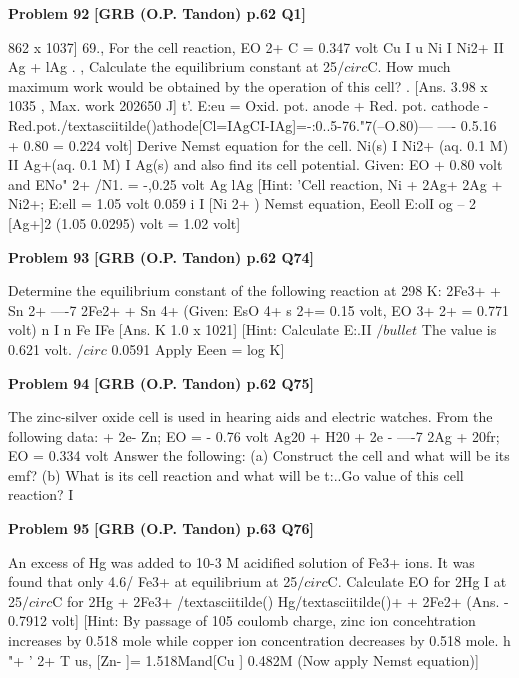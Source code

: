 \begin{problembox}
\textbf{Problem 92} \hfill \textbf{[GRB (O.P. Tandon) p.62 Q1]}
\label{q:ext-grb_all_questions-92}

862 x 1037] 
69., For the cell reaction, 
EO 2+ C = 0.347 volt 
Cu 
I u 
Ni I Ni2+ II Ag + lAg 
. 
, 
Calculate the equilibrium constant at 25$/circ$C. How much 
maximum work would be obtained by the operation of this 
cell? 
. 
[Ans. 
3.98 x 1035 , Max. work 
202650 J] 
t'. 
E:eu = Oxid. pot. anode + Red. pot. cathode 
-Red.pot./textasciitilde()athode[Cl=IAgCI-IAg]=-:0..5-76."7(--O.80)--- ----
0.5.16 + 0.80 = 0.224 volt] 
Derive Nemst equation for the cell. 
Ni(s) I Ni2+ (aq. 0.1 M) II Ag+(aq. 0.1 M) I Ag(s) 
and also find its cell potential. Given: 
EO + 
0.80 volt and ENo" 2+ /N1. = -,0.25 volt 
Ag lAg 
[Hint: 'Cell reaction, 
Ni + 2Ag+ 
2Ag + Ni2+; 
E:ell = 1.05 volt 
0.059 i I 
[Ni 2+ ) 
Nemst equation, Eeoll 
E:olI 
og --
2 
[Ag+]2 
(1.05 
0.0295) volt 
= 1.02 volt]
\end{problembox}

\begin{problembox}
\textbf{Problem 93} \hfill \textbf{[GRB (O.P. Tandon) p.62 Q74]}
\label{q:ext-grb_all_questions-93}

Determine the equilibrium constant of the following reaction 
at 298 K: 
2Fe3+ + Sn 2+ ----7 2Fe2+ + Sn 4+ 
(Given: EsO 4+ s 2+= 0.15 volt, EO 3+ 
2+ = 0.771 volt) 
n 
I n 
Fe 
IFe 
[Ans. 
K 
1.0 x 1021] 
[Hint: 
Calculate E:.II $/bullet$ The value is 0.621 volt. 
$/circ$ 
0.0591 
Apply Eeen = 
log K]
\end{problembox}

\begin{problembox}
\textbf{Problem 94} \hfill \textbf{[GRB (O.P. Tandon) p.62 Q75]}
\label{q:ext-grb_all_questions-94}

The zinc-silver oxide cell is used in hearing aids and electric 
watches. From the following data: 
+ 2e-
Zn; 
EO = - 0.76 volt 
Ag20 + H20 + 2e - ----7 2Ag + 20fr; 
EO = 0.334 volt 
Answer the following: 
(a) Construct the cell and what will be its emf? 
(b) What is its cell reaction and what will be t:..Go value of this 
cell reaction? 
I
\end{problembox}

\begin{problembox}
\textbf{Problem 95} \hfill \textbf{[GRB (O.P. Tandon) p.63 Q76]}
\label{q:ext-grb_all_questions-95}

An excess of Hg was added to 10-3 M acidified solution of 
Fe3+ ions. It was found that only 4.6/%
Fe3+ at equilibrium at 25$/circ$C. Calculate EO for 2Hg I 
at 
25$/circ$C for 
2Hg + 2Fe3+ /textasciitilde() 
Hg/textasciitilde()+ + 2Fe2+ 
(Ans. 
- 0.7912 volt] 
[Hint: 
By passage of 105 
coulomb charge, 
zinc 
ion 
concehtration increases by 0.518 mole while copper ion 
concentration decreases by 0.518 mole. 
h 
"+ ' 
2+ 
T us, [Zn- ]= 1.518Mand[Cu 
] 0.482M 
(Now apply Nemst equation)]
\end{problembox}

